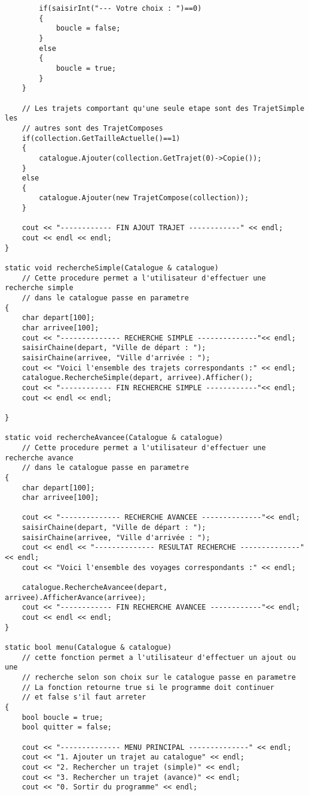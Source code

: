 \begin{verbatim}
        if(saisirInt("--- Votre choix : ")==0)
        {
            boucle = false;
        }
        else
        {
            boucle = true;
        }
    }
    
    // Les trajets comportant qu'une seule etape sont des TrajetSimple les
    // autres sont des TrajetComposes
    if(collection.GetTailleActuelle()==1)
    {
        catalogue.Ajouter(collection.GetTrajet(0)->Copie());
    }
    else
    {
        catalogue.Ajouter(new TrajetCompose(collection));
    }
    
    cout << "------------ FIN AJOUT TRAJET ------------" << endl;
	cout << endl << endl;
}

static void rechercheSimple(Catalogue & catalogue)
    // Cette procedure permet a l'utilisateur d'effectuer une recherche simple
    // dans le catalogue passe en parametre
{
    char depart[100];
    char arrivee[100];
    cout << "-------------- RECHERCHE SIMPLE --------------"<< endl;
    saisirChaine(depart, "Ville de départ : ");
    saisirChaine(arrivee, "Ville d'arrivée : ");
    cout << "Voici l'ensemble des trajets correspondants :" << endl;
    catalogue.RechercheSimple(depart, arrivee).Afficher();
	cout << "------------ FIN RECHERCHE SIMPLE ------------"<< endl;
	cout << endl << endl;
    
}

static void rechercheAvancee(Catalogue & catalogue)
    // Cette procedure permet a l'utilisateur d'effectuer une recherche avance
    // dans le catalogue passe en parametre
{
    char depart[100];
    char arrivee[100];
    
    cout << "-------------- RECHERCHE AVANCEE --------------"<< endl;
    saisirChaine(depart, "Ville de départ : ");
    saisirChaine(arrivee, "Ville d'arrivée : ");
	cout << endl << "-------------- RESULTAT RECHERCHE --------------"<< endl;
    cout << "Voici l'ensemble des voyages correspondants :" << endl;
    
    catalogue.RechercheAvancee(depart, arrivee).AfficherAvance(arrivee);
	cout << "------------ FIN RECHERCHE AVANCEE ------------"<< endl;
	cout << endl << endl;
}

static bool menu(Catalogue & catalogue)
    // cette fonction permet a l'utilisateur d'effectuer un ajout ou une
    // recherche selon son choix sur le catalogue passe en parametre
    // La fonction retourne true si le programme doit continuer
    // et false s'il faut arreter
{
    bool boucle = true;
    bool quitter = false;
    
    cout << "-------------- MENU PRINCIPAL --------------" << endl;
    cout << "1. Ajouter un trajet au catalogue" << endl;
    cout << "2. Rechercher un trajet (simple)" << endl;
    cout << "3. Rechercher un trajet (avance)" << endl;
    cout << "0. Sortir du programme" << endl;
    

\end{verbatim}
